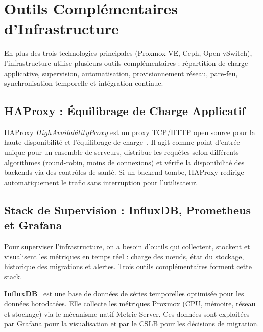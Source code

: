 \section{Outils Complémentaires d'Infrastructure}

\par En plus des trois technologies principales (Proxmox VE, Ceph, Open vSwitch), l'infrastructure utilise plusieurs outils complémentaires : répartition de charge applicative, supervision, automatisation, provisionnement réseau, pare-feu, synchronisation temporelle et intégration continue.\\

\subsection{HAProxy : Équilibrage de Charge Applicatif}

\par HAProxy \(High Availability Proxy\) est un proxy TCP/HTTP open source pour la haute disponibilité et l'équilibrage de charge~\cite{ref26}. Il agit comme point d'entrée unique pour un ensemble de serveurs, distribue les requêtes selon différents algorithmes (round-robin, moins de connexions) et vérifie la disponibilité des backends via des contrôles de santé. Si un backend tombe, HAProxy redirige automatiquement le trafic sans interruption pour l'utilisateur.

\subsection{Stack de Supervision : InfluxDB, Prometheus et Grafana}

\par Pour superviser l'infrastructure, on a besoin d'outils qui collectent, stockent et visualisent les métriques en temps réel : charge des n\oe{}uds, état du stockage, historique des migrations et alertes. Trois outils complémentaires forment cette stack.\\

\par \textbf{InfluxDB}~\cite{ref24} est une base de données de séries temporelles optimisée pour les données horodatées. Elle collecte les métriques Proxmox (CPU, mémoire, réseau et stockage) via le mécanisme natif Metric Server. Ces données sont exploitées par Grafana pour la visualisation et par le CSLB pour les décisions de migration.\\


